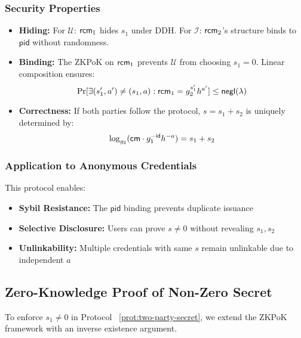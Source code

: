 \subsubsection{Security Properties}
\begin{itemize}
    \item \textbf{Hiding:} For $\mathcal{U}$: $\mathsf{rcm}_1$ hides $s_1$ under DDH. For $\mathcal{I}$: $\mathsf{rcm}_2$'s structure binds to $\textsf{pid}$ without randomness.
    
    \item \textbf{Binding:} The ZKPoK on $\mathsf{rcm}_1$ prevents $\mathcal{U}$ from choosing $s_1 = 0$. Linear composition ensures:
    \[
    \Pr[\exists (s_1', a') \neq (s_1, a) : \mathsf{rcm}_1 = g_2^{s_1'} h^{a'}] \leq \textsf{negl}(\lambda)
    \]
    
    \item \textbf{Correctness:} If both parties follow the protocol, $s = s_1 + s_2$ is uniquely determined by:
    \[
    \log_{g_2}(\mathsf{cm} \cdot g_1^{-\textsf{id}} h^{-a}) = s_1 + s_2
    \]
\end{itemize}

\subsubsection{Application to Anonymous Credentials}
This protocol enables:
\begin{itemize}
    \item \textbf{Sybil Resistance:} The $\textsf{pid}$ binding prevents duplicate issuance
    \item \textbf{Selective Disclosure:} Users can prove $s \neq 0$ without revealing $s_1, s_2$
    \item \textbf{Unlinkability:} Multiple credentials with same $s$ remain unlinkable due to independent $a$
\end{itemize}















\subsection{Zero-Knowledge Proof of Non-Zero Secret}\label{pok-nonzero}
\label{subsec:zkp-nonzero}

To enforce \(s_1 \neq 0\) in Protocol ~\ref{prot:two-party-secret}, we extend the ZKPoK framework with an inverse existence argument.

